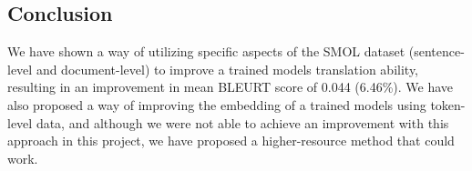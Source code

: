 \subsection{Conclusion}
We have shown a way of utilizing specific aspects of the SMOL dataset (sentence-level and document-level) to improve a trained models translation ability, resulting in an improvement in mean BLEURT score of 0.044 (6.46\%). We have also proposed a way of improving the embedding of a trained models using token-level data, and although we were not able to achieve an improvement with this approach in this project, we have proposed a higher-resource method that could work.

